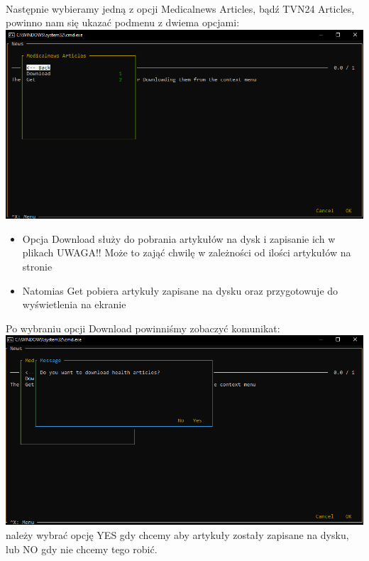 \documentclass{article}
\begin{document}
\paragraph{}
Następnie wybieramy jedną z opcji Medicalnews Articles, bądź TVN24 Articles, powinno nam się ukazać podmenu z dwiema opcjami:\\
\includegraphics[width=\textwidth]{images/news_screen_sub_menu.png}

\begin{itemize}
    \item Opcja Download służy do pobrania artykułów na dysk i zapisanie ich w plikach UWAGA!! Może to zająć chwilę w zależności od ilości artykułów na stronie
    \item Natomias Get pobiera artykuły zapisane na dysku oraz przygotowuje do wyświetlenia na ekranie
\end{itemize}

Po wybraniu opcji Download powinniśmy zobaczyć komunikat:\\
\includegraphics[width=\textwidth]{images/download_articles.png}
należy wybrać opcję YES gdy chcemy aby artykuły zostały zapisane na dysku, lub NO gdy nie chcemy tego robić.\\
\end{document}

